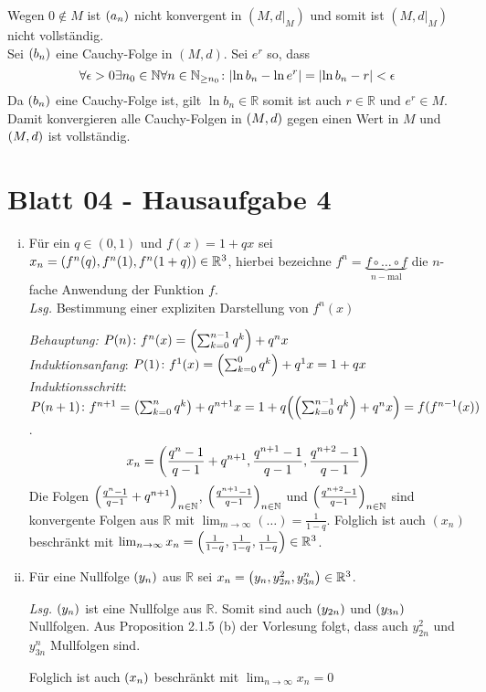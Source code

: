 \documentclass{scrreprt}
\begin{document}
\begin{enumerate}[(i)]
  Wegen $0 \notin M$ ist $\qty(a_n)$ nicht konvergent in $(M, d|_M)$ und somit ist $(M, d|_M)$
  nicht vollständig. \\

  Sei $\qty(b_n)$ eine Cauchy-Folge in $(M, d)$.
  Sei $e^r$ so, dass
  \[
    \forall \epsilon > 0 \exists n_0 \in \mathbb{N} \forall n \in \mathbb{N}_{\geq n_0} \colon
    \abs{\ln b_n - \ln e^r} = \abs{\ln b_n - r} < \epsilon
  \]
  Da $\qty(b_n)$ eine Cauchy-Folge ist, gilt $\ln b_n \in \mathbb{R}$ somit ist auch $r \in \mathbb{R}$
  und $e^r \in M$.
  Damit konvergieren alle Cauchy-Folgen in $\qty(M, d)$ gegen einen Wert in $M$ und $\qty(M, d)$
  ist vollständig.

\end{enumerate}

\section{Blatt 04 - Hausaufgabe 4}

\begin{enumerate}[(i)]
\item Für ein $q \in (0, 1)$ und $f(x) = 1 + qx$ sei
  $x_n = \qty(f^n(q), f^n(1), f^n(1 + q)) \in \mathbb{R}^3$, hierbei bezeichne
  $f^n = \underset{n-\text{mal}}{\underbrace{f \circ \ldots \circ f}}$ die $n$-fache
  Anwendung der Funktion $f$. \\

  \textit{Lsg.} Bestimmung einer expliziten Darstellung von $f^n(x)$

  \textit{Behauptung:} $P(n) \colon f^n (x) = \qty(\sum_{k = 0}^{n - 1} q^k) + q^nx$ \\
  \textit{Induktionsanfang}: $P(1) \colon f^1(x) = \qty(\sum_{k = 0}^{0} q^k) + q^1x = 1 + qx$ \\
  \textit{Induktionsschritt}: $P(n + 1) \colon f^{n + 1} = \qty(\sum_{k = 0}^{n} q^k) + q^{n + 1}x
  = 1 + q\qty(\qty(\sum_{k = 0}^{n - 1} q^k) + q^{n}x) = f(f^{n - 1}(x))$.
  \begin{align*}
    x_n = \qty(\frac{q^n - 1}{q - 1} + q^{n + 1}, \frac{q^{n + 1} - 1}{q - 1}, \frac{q^{n + 2} - 1}{q - 1})
  \end{align*}
  Die Folgen $\qty(\frac{q^n - 1}{q - 1} + q^{n + 1})_{n \in \mathbb{N}}$,
  $\qty(\frac{q^{n + 1} - 1}{q - 1})_{n \in \mathbb{N}}$
  und
  $\qty(\frac{q^{n + 2} - 1}{q - 1})_{n \in \mathbb{N}}$ sind konvergente Folgen aus
  $\mathbb{R}$ mit $\lim_{m \to \infty} (\ldots) = \frac{1}{1 - q}$.
  Folglich ist auch $(x_n)$ beschränkt mit
  $\lim_{n \to \infty} x_n = \qty( \frac{1}{1 - q},  \frac{1}{1 - q},  \frac{1}{1 - q}) \in \mathbb{R}^3$.
\item Für eine Nullfolge $\qty(y_n)$ aus $\mathbb{R}$ sei
  $x_n = \qty(y_n, y_{2n}^2, y_{3n}^n) \in \mathbb{R}^3$.

  \textit{Lsg.} $\qty(y_n)$ ist eine Nullfolge aus $\mathbb{R}$.
  Somit sind auch $\qty(y_{2n})$ und $\qty(y_{3n})$ Nullfolgen.
  Aus Proposition 2.1.5 (b) der Vorlesung folgt, dass auch $y_{2n}^2$ und $y_{3n}^n$ Mullfolgen sind.

  Folglich ist auch $\qty(x_n)$ beschränkt mit $\lim_{n \to \infty} x_n = 0$
\end{enumerate}
\end{document}
